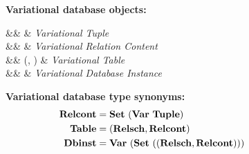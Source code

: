 \begin{figure}
%
\textbf{Variational database objects:}
\begin{syntax}
%
\synDef \vTuple {\vartype \tupletype} &\eqq&  & \textit{Variational Tuple}\\
\synDef \vRelCont \vRelContSet &\eqq& \setDef {\vi \vTuple \numTuples} & \textit{Variational Relation Content}\\
\synDef \vTab \tabletype &\eqq& (\vRelSch, \vRelCont) & \textit{Variational Table}\\
\synDef \vdbInst \vdbInstSet &\eqq& \annot [\dimMeta] {\setDef {\vi \vTab \numRels} } & \textit{Variational Database Instance}
\end{syntax}

\medskip
\textbf{Variational database type synonyms:}
\begin{alignat*}{1}
\vRelContSet &= \settype {(\vartype \tupletype)}\\
\tabletype &= \typepair{\vRelSchSet, \vRelContSet}\\
\vdbInstSet &= \vartype {\left( \settype {\left(\left(\relschtype,\relconttype\right)\right)}\right)}
\end{alignat*}


\end{figure}
